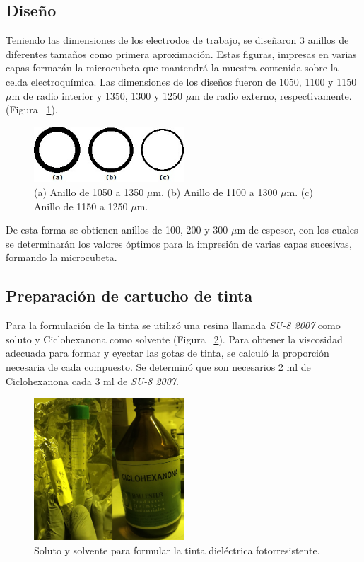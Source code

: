 \subsection{Diseño}
Teniendo las dimensiones de los electrodos de trabajo, se diseñaron 3 anillos de diferentes tamaños como primera aproximación. Estas figuras, impresas en varias capas formarán la microcubeta que mantendrá la muestra contenida sobre la celda electroquímica. Las dimensiones de los diseños fueron de 1050, 1100 y 1150 $\mu$m de radio interior y 1350, 1300 y 1250 $\mu$m de radio externo, respectivamente. (Figura ~\ref{fig:Figura_anillos_SU8}).

\begin{figure}[H]
  \centering
    \includegraphics[width=0.5\textwidth]{Figuras/Figura_anillos_SU8}
  \caption{(a) Anillo de 1050 a 1350 $\mu$m. (b) Anillo de 1100 a 1300 $\mu$m. (c) Anillo de 1150 a 1250 $\mu$m.}
  \label{fig:Figura_anillos_SU8}
\end{figure}

De esta forma se obtienen anillos de 100, 200 y 300 $\mu$m de espesor, con los cuales se determinarán los valores óptimos para la impresión de varias capas sucesivas, formando la microcubeta.

\subsection{Preparación de cartucho de tinta}
Para la formulación de la tinta se utilizó una resina llamada \textit{SU-8 2007} como soluto y Ciclohexanona como solvente (Figura ~\ref{fig:Figura_SU8_Ciclohexanona}). Para obtener la viscosidad adecuada para formar y eyectar las gotas de tinta, se calculó la proporción necesaria de cada compuesto. Se determinó que son necesarios 2 ml de Ciclohexanona cada 3 ml de \textit{SU-8 2007}.

\begin{figure}[H]
  \centering
    \includegraphics[width=0.5\textwidth]{Figuras/Figura_SU8_Ciclohexanona}
  \caption{Soluto y solvente para formular la tinta dieléctrica fotorresistente.}
  \label{fig:Figura_SU8_Ciclohexanona}
\end{figure}

